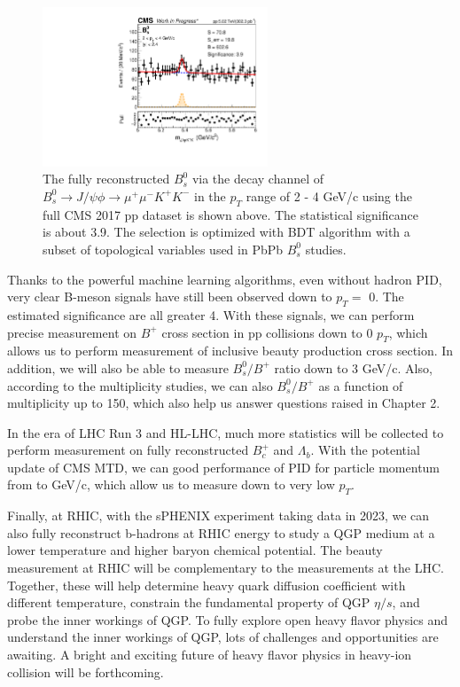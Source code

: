  \begin{figure}[hbtp]
\begin{center}
\includegraphics[width=0.60\textwidth]{Figures/Chapter6/BsLow.pdf}
\caption{The fully reconstructed $B^0_s$ via the decay channel of $B^0_s\rightarrow J/\psi \phi  \rightarrow \mu^+\mu^- K^+ K^-$ in the $p_T$ range of 2 - 4 GeV/c using the full CMS 2017 pp dataset is shown above. The statistical significance is about 3.9. The selection is optimized with BDT algorithm with a subset of topological variables used in PbPb $B^0_s$ studies.}
\label{BsLow}
\end{center}
\end{figure}   

Thanks to the powerful machine learning algorithms, even without hadron PID, very clear B-meson signals have still been observed down to $p_T =$ 0. The estimated significance are all greater 4. With these signals, we can perform precise measurement on $B^+$ cross section in pp collisions down to 0 $p_T$, which allows us to perform measurement of inclusive beauty production cross section. In addition, we will also be able to measure $B^0_s/B^+$ ratio down to 3 GeV/c. Also, according to the multiplicity studies, we can also $B^0_s/B^+$ as a function of multiplicity up to 150, which also help us answer questions raised in Chapter 2. 

In the era of LHC Run 3 and HL-LHC, much more statistics will be collected to perform measurement on fully reconstructed $B^+_c$ and $\Lambda_b$. With the potential update of CMS MTD, we can good performance of PID for particle momentum from to GeV/c, which allow us to measure down to very low $p_T$. 

Finally, at RHIC, with the sPHENIX experiment taking data in 2023, we can also fully reconstruct b-hadrons at RHIC energy to study a QGP medium at a lower temperature and higher baryon chemical potential. The beauty measurement at RHIC will be complementary to the measurements at the LHC. Together, these will help determine heavy quark diffusion coefficient with different temperature, constrain the fundamental property of QGP $\eta/s$, and probe the inner workings of QGP. To fully explore open heavy flavor physics and understand the inner workings of QGP, lots of challenges and opportunities are awaiting. A bright and exciting future of heavy flavor physics in heavy-ion collision will be forthcoming.



